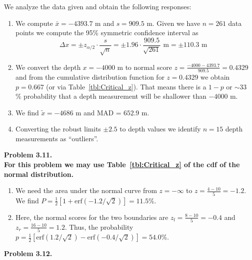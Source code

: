 We analyze the data given and obtain the following responses:
\begin{enumerate}[label=\alph*)]
	\item We compute $\bar{x} = -4393.7$ m and $s = 909.5$ m.  Given we have $n = 261$ data points
	we compute the 95\% symmetric confidence interval as
	$$
	\Delta x = \pm z_{\alpha/2} \cdot \frac{s}{\sqrt{n}} = \pm 1.96 \cdot \frac{909.5}{\sqrt{261}} \mbox{ m} = \pm 110.3 \mbox{ m}
	$$
	\item We convert the depth $x = -4000$ m to normal score $z = \frac{-4000 - 4393.7 }{909.5} = 0.4329$ and from
	the cumulative distribution function for $z = 0.4329$ we obtain $p = 0.667$ (or via Table~\ref{tbl:Critical_z}).  That means there is a $1-p$ or $\sim 33$\%
	probability that a depth measurement will be shallower than $-4000$ m.
	\item We find $\tilde{x} = -4686$ m and MAD = $652.9$ m.
	\item Converting the robust limits $\pm 2.5$ to depth values we identify $n = 15$ depth measurements as ``outliers''.
\end{enumerate}


\noindent
\bf{Problem 3.11.} \\

For this problem we may use Table~\ref{tbl:Critical_z} of the cdf of the normal distribution.
\begin{enumerate}[label=\alph*)]
\item We need the area under the normal curve from $z = -\infty$ to $z = \frac{4 - 10}{5} = -1.2$.
We find $P = \frac{1}{2} [1 + \mbox{erf} (-1.2/\sqrt{2})] = 11.5$\%.
\item Here, the normal scores for the
two boundaries are $z_l = \frac{8 - 10}{5} = -0.4$ and $z_r = \frac{16 - 10}{5} = 1.2$.  Thus, the
probability $p = \frac{1}{2} [\mbox{erf} (1.2/\sqrt{2}) - \mbox{erf}(-0.4/\sqrt{2})] = 54.0$\%.
\end{enumerate}

\noindent
\bf{Problem 3.12.} \\

